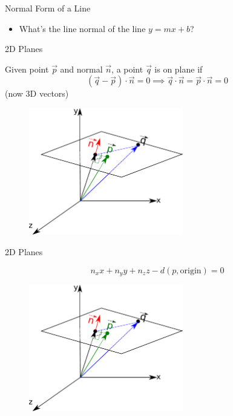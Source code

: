 \documentclass{beamer}
\begin{document}
\begin{frame}{Normal Form of a Line}


\begin{itemize}[label=$\vartriangleright$]

\item What's the line normal of the line $y = mx + b$?

\end{itemize}

\end{frame}


\begin{frame}{2D Planes}

Given point $\vec{p}$ and normal $\vec{n}$, a point $\vec{q}$ is on plane if
\[ (\vec{q} - \vec{p}) \cdot \vec{n} = 0  \implies \vec{q} \cdot \vec{n} = \vec{p} \cdot \vec{n} = 0\]
(now 3D vectors)

\begin{figure}[t]
	\centering
	\includegraphics[width=0.6\textwidth]{PlaneNormalForm.pdf}
\end{figure}

\end{frame}


\begin{frame}{2D Planes}

\[ n_x x + n_y y + n_z z - d(p, \text{origin}) = 0 \]

\begin{figure}[t]
	\centering
	\includegraphics[width=0.6\textwidth]{PlaneNormalForm.pdf}
\end{figure}

\end{frame}
\end{document}
